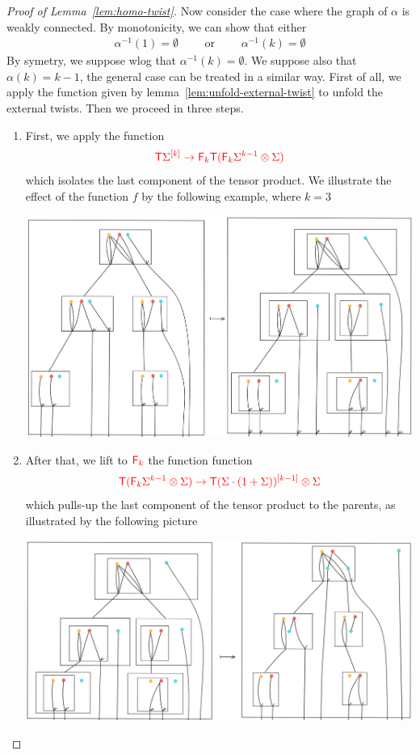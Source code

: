 \begin{proof}[Proof of Lemma~\ref{lem:homo-twist}]
\medskip
Now consider the case where the graph of $\alpha$ is weakly connected. By monotonicity, we can show that either
\begin{align*}
\alpha^{-1}(1)=\emptyset\qquad\text{ or }\qquad\alpha^{-1}(k)=\emptyset
\end{align*}
By symetry, we suppose wlog that $\alpha^{-1}(k)=\emptyset$. We suppose also that $\alpha(k)=k-1$, the general case can be treated in a similar way.
First of all, we apply the function given by lemma~\ref{lem:unfold-external-twist} to unfold the external twists.  Then we proceed in three steps. 
\begin{enumerate}
\item First, we apply the function
\begin{align*}
\ranked{\tmonad \mati k \Sigma \to \reduce k \tmonad(\reduce k\Sigma^{k-1}\otimes \Sigma)}
\end{align*} 
which isolates the last component of the tensor product. We illustrate the effect of the function $f$ by the following example, where $k=3$
\begin{center}
\includegraphics[scale=.1]{MyPic20.jpg}
\end{center}
\item After that, we lift to $\reduce k$ the function function
\begin{align*}
\ranked{\tmonad(\reduce k\Sigma^{k-1}\otimes \Sigma) \to \tmonad\mati {k-1} {(\Sigma\cdot(1+\Sigma))}\otimes \Sigma}
\end{align*}
which pulls-up the last component of the tensor product to the parents, as illustrated by the following picture 
\begin{center}
\includegraphics[scale=.12]{MyPic21.jpg}

\end{center}
\end{enumerate}
\end{proof}

